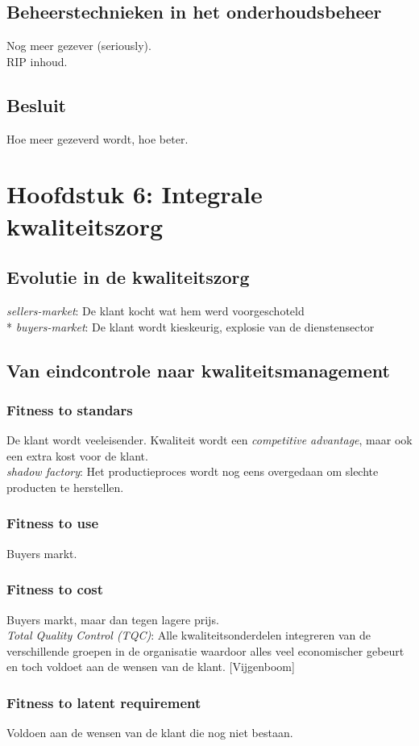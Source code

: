 \documentclass[12pt]{article}
\begin{document}
\subsection{Beheerstechnieken in het onderhoudsbeheer}
Nog meer gezever (seriously).\\
RIP inhoud.
\subsection{Besluit}
Hoe meer gezeverd wordt, hoe beter.
\clearpage
\section{Hoofdstuk 6: Integrale kwaliteitszorg}
\subsection{Evolutie in de kwaliteitszorg}
\textit{sellers-market}: De klant kocht wat hem werd voorgeschoteld\\*
\textit{buyers-market}: De klant wordt kieskeurig, explosie van de dienstensector
\subsection{Van eindcontrole naar kwaliteitsmanagement}
\subsubsection{Fitness to standars}
De klant wordt veeleisender. Kwaliteit wordt een \textit{competitive advantage}, maar ook een extra kost voor de klant.\\
\textit{shadow factory}: Het productieproces wordt nog eens overgedaan om slechte producten te herstellen.
\subsubsection{Fitness to use}
Buyers markt.
\subsubsection{Fitness to cost}
Buyers markt, maar dan tegen lagere prijs.\\
\textit{Total Quality Control (TQC)}: Alle kwaliteitsonderdelen integreren van de verschillende groepen in de organisatie waardoor alles veel economischer gebeurt en toch voldoet aan de wensen van de klant. [Vijgenboom]
\subsubsection{Fitness to latent requirement}
Voldoen aan de wensen van de klant die nog niet bestaan.
\end{document}
